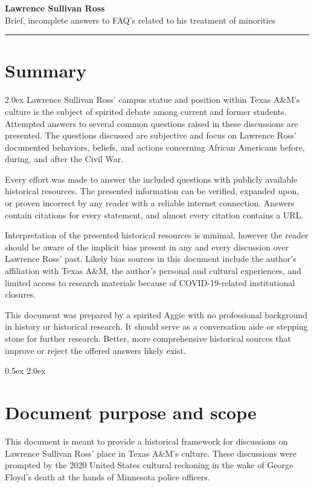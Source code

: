 \documentclass[12pt]{article}
\begin{document}
\Large{\textbf{Lawrence Sullivan Ross \\}}
\large{Brief, incomplete answers to FAQ's related to his treatment of minorities \\}
\rule{\textwidth}{1pt}

\section{Summary}
\parskip 2.0ex
Lawrence Sullivan Ross' campus statue and position within Texas A\&M's culture is the subject of spirited debate among current and former students. Attempted answers to several common questions raised in these discussions are presented. The questions discussed are subjective and focus on Lawrence Ross' documented behaviors, beliefs, and actions concerning African Americans before, during, and after the Civil War. 

Every effort was made to answer the included questions with publicly available historical resources. The presented information can be verified, expanded upon, or proven incorrect by any reader with a reliable internet connection. Answers contain citations for every statement, and almost every citation contains a URL. 

Interpretation of the presented historical resources is minimal, however the reader should be aware of the implicit bias present in any and every discussion over Lawrence Ross' past. Likely bias sources in this document include the author's affiliation with Texas A\&M, the author's personal and cultural experiences, and limited access to research materials because of COVID-19-related institutional closures.

This document was prepared by a spirited Aggie with no professional background in history or  historical research. It should serve as a conversation aide or stepping stone for further research. Better, more comprehensive historical sources that improve or reject the offered answers likely exist. 

\parskip 0.5ex
\newpage
\tableofcontents
\parskip 2.0ex

\newpage
\section{Document purpose and scope}
This document is meant to provide a historical framework for discussions on Lawrence Sullivan Ross' place in Texas A\&M's culture. These discussions were prompted by the 2020 United States cultural reckoning in the wake of George Floyd's death at the hands of Minnesota police officers. 
\end{document}

